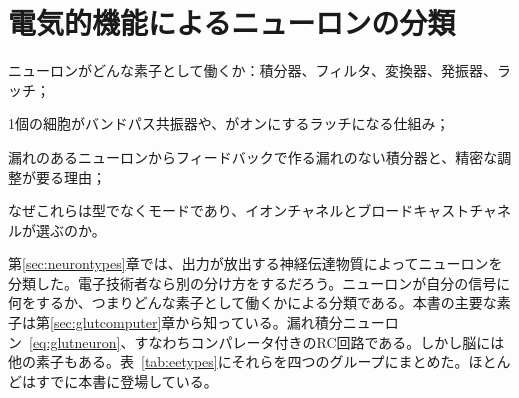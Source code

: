\chapter{電気的機能によるニューロンの分類}
\label{sec:eetypes}
\begin{chaptergoals}
\item ニューロンがどんな素子として働くか：積分器、フィルタ、変換器、発振器、ラッチ；
\item 1個の細胞がバンドパス共振器や、がオンにするラッチになる仕組み；
\item 漏れのあるニューロンからフィードバックで作る漏れのない積分器と、精密な調整が要る理由；
\item なぜこれらは型でなくモードであり、イオンチャネルとブロードキャストチャネルが選ぶのか。
\end{chaptergoals}

第\ref{sec:neurontypes}章では、出力が放出する神経伝達物質によってニューロンを分類した。電子技術者なら別の分け方をするだろう。ニューロンが自分の信号に何をするか、つまりどんな素子として働くかによる分類である。本書の主要な素子は第\ref{sec:glutcomputer}章から知っている。漏れ積分ニューロン~\eqref{eq:glutneuron}、すなわちコンパレータ付きのRC回路である。しかし脳には他の素子もある。表~\ref{tab:eetypes}にそれらを四つのグループにまとめた。ほとんどはすでに本書に登場している。

